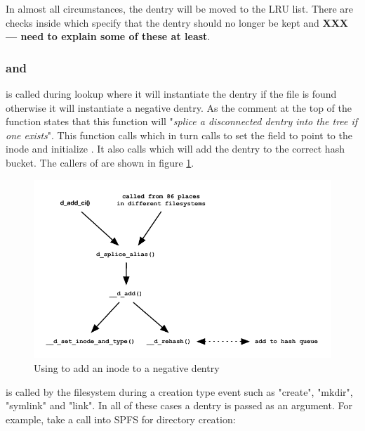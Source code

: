 In almost all circumstances, the dentry will be moved to the LRU list. There are checks inside  which specify that the dentry should no longer be kept and \textbf{XXX --- need to explain some of these at least}. 


\subsubsection{ and }

 is called during lookup where it will instantiate the dentry if the file is found otherwise it will instantiate a negative dentry. As the comment at the top of the function states that this function will "\textit{splice a disconnected dentry into the tree if one exists}". This function calls  which in turn calls  to set the  field to point to the inode and initialize . It also calls  which will add the dentry to the correct hash bucket. The callers of are shown in figure \ref{fig:d-splice-alias}.

\begin{figure}[h]
	\includegraphics[scale=0.8]{figures/d-splice-alias.pdf}
	\centering
	\caption{Using  to add an inode to a negative dentry}
	\label{fig:d-splice-alias}
\end{figure}

 is called by the filesystem during a creation type event such as "create", "mkdir", "symlink" and "link". In all of these cases a dentry is passed as an argument. For example, take a call into SPFS for directory creation:

